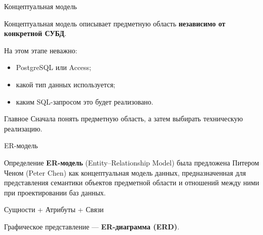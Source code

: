 \documentclass[aspectratio=169]{beamer}
\begin{document}
\begin{frame}{Концептуальная модель}

Концептуальная модель описывает предметную область
\textbf{независимо от конкретной СУБД}.

\vspace{0.4cm}

На этом этапе неважно:

\begin{itemize}
  \item PostgreSQL или Access;
  \item какой тип данных используется;
  \item каким SQL-запросом это будет реализовано.
\end{itemize}

\vspace{0.4cm}

\begin{alertblock}{Главное}
Сначала понять предметную область,
а затем выбирать техническую реализацию.
\end{alertblock}

\end{frame}


\begin{frame}{ER-модель}

\begin{block}{Определение}
\textbf{ER-модель} (Entity--Relationship Model) была
предложена Питером Ченом (Peter Chen) как концептуальная
модель данных, предназначенная для представления
семантики объектов предметной области и отношений
между ними при проектировании баз данных.
\end{block}

\vspace{0.4cm}

\begin{center}
\Large
Сущности
\quad+\quad
Атрибуты
\quad+\quad
Связи
\end{center}

Графическое представление — \textbf{ER-диаграмма (ERD)}.

\end{frame}
\end{document}
